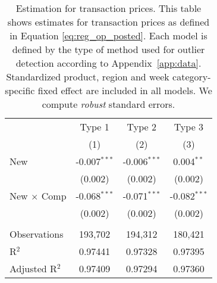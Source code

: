 
\begin{table}[H]
   \centering
   \begin{tabular}{lccc}
      \toprule
                                & Type 1         & Type 2         & Type 3 \\   
                                & (1)            & (2)            & (3)\\  
      \midrule 
      New                       & -0.007$^{***}$ & -0.006$^{***}$ & 0.004$^{**}$\\   
                                & (0.002)        & (0.002)        & (0.002)\\   
      New $\times$ Comp  & -0.068$^{***}$ & -0.071$^{***}$ & -0.082$^{***}$\\   
                                & (0.002)        & (0.002)        & (0.002)\\   
       \\
      Observations              & 193,702        & 194,312        & 180,421\\  
      R$^2$                     & 0.97441        & 0.97328        & 0.97395\\  
      Adjusted R$^2$            & 0.97409        & 0.97294        & 0.97360\\  
      \bottomrule
   \end{tabular}
   
   \par \raggedright 
   \caption{Estimation for transaction prices. This table shows estimates for transaction prices as defined in Equation \eqref{eq:reg_op_posted}. Each model is defined by the type of method used for outlier detection according to Appendix~\ref{app:data}. Standardized product, region and week category-specific fixed effect are included in all models. We compute \textit{robust} standard errors.}
\end{table}


